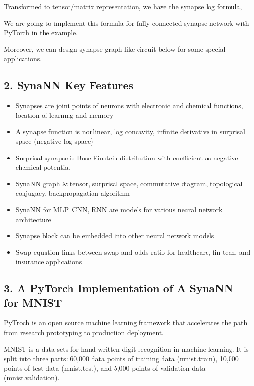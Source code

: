 \documentclass[
]{article}
\begin{document}
Transformed to tensor/matrix representation, we have the synapse log
formula,

We are going to implement this formula for fully-connected synapse
network with PyTorch in the example.

Moreover, we can design synapse graph like circuit below for some
special applications.

\hypertarget{header-n25}{%
\subsection{2. SynaNN Key Features}\label{header-n25}}

\begin{itemize}
\item
  Synapses are joint points of neurons with electronic and chemical
  functions, location of learning and memory
\item
  A synapse function is nonlinear, log concavity, infinite derivative in
  surprisal space (negative log space)
\item
  Surprisal synapse is Bose-Einstein distribution with coefficient as
  negative chemical potential
\item
  SynaNN graph \& tensor, surprisal space, commutative diagram,
  topological conjugacy, backpropagation algorithm
\item
  SynaNN for MLP, CNN, RNN are models for various neural network
  architecture
\item
  Synapse block can be embedded into other neural network models
\item
  Swap equation links between swap and odds ratio for healthcare,
  fin-tech, and insurance applications
\end{itemize}

\hypertarget{header-n41}{%
\subsection{3. A PyTorch Implementation of A SynaNN for
MNIST}\label{header-n41}}

PyTroch is an open source machine learning framework that accelerates
the path from research prototyping to production deployment.

MNIST is a data sets for hand-written digit recognition in machine
learning. It is split into three parts: 60,000 data points of training
data (mnist.train), 10,000 points of test data (mnist.test), and 5,000
points of validation data (mnist.validation).
\end{document}
